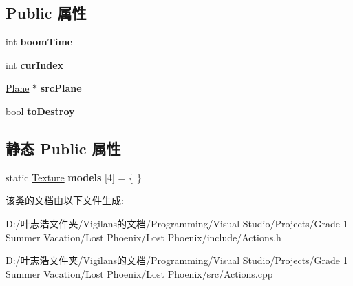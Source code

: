 \subsection*{Public 属性}
\begin{DoxyCompactItemize}
\item 
\mbox{\label{class_action___plane___explode_a3425e9988fc97a794c01b3288df4afe6}} 
int {\bfseries boom\+Time}
\item 
\mbox{\label{class_action___plane___explode_a5da7d39e28db0b1a852ae81cc6e96ba5}} 
int {\bfseries cur\+Index}
\item 
\mbox{\label{class_action___plane___explode_a98d4991b3266a6c7fc5ebbad4d41f136}} 
\hyperlink{class_plane}{Plane} $\ast$ {\bfseries src\+Plane}
\item 
\mbox{\label{class_action___plane___explode_a655f5cf52656c4ce16040d2310494029}} 
bool {\bfseries to\+Destroy}
\end{DoxyCompactItemize}
\subsection*{静态 Public 属性}
\begin{DoxyCompactItemize}
\item 
\mbox{\label{class_action___plane___explode_ab37c2419e1e16a739b856de09df79909}} 
static \hyperlink{struct_texture}{Texture} {\bfseries models} \mbox{[}4\mbox{]} = \{ \}
\end{DoxyCompactItemize}


该类的文档由以下文件生成\+:\begin{DoxyCompactItemize}
\item 
D\+:/叶志浩文件夹/\+Vigilans的文档/\+Programming/\+Visual Studio/\+Projects/\+Grade 1 Summer Vacation/\+Lost Phoenix/\+Lost Phoenix/include/Actions.\+h\item 
D\+:/叶志浩文件夹/\+Vigilans的文档/\+Programming/\+Visual Studio/\+Projects/\+Grade 1 Summer Vacation/\+Lost Phoenix/\+Lost Phoenix/src/Actions.\+cpp\end{DoxyCompactItemize}
